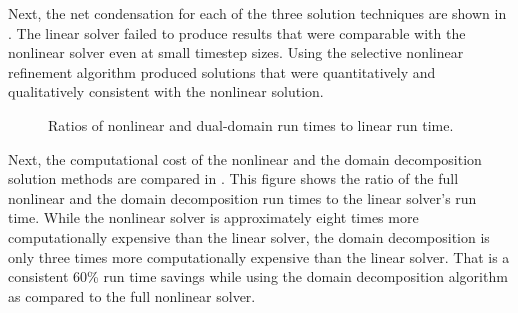 Next, the net condensation for each of the three solution techniques are shown in .
The linear solver failed to produce results that were comparable with the nonlinear solver even at small timestep sizes.
Using the selective nonlinear refinement algorithm produced solutions that were quantitatively and qualitatively consistent with the nonlinear solution.

\begin{figure}[h!tb]
\centering

\caption{Ratios of nonlinear and dual-domain run times to linear run time.}
\label{fig:refillRunTimeRatios}
\end{figure}

Next, the computational cost of the nonlinear and the domain decomposition solution methods are compared in .
This figure shows the ratio of the full nonlinear and the domain decomposition run times to the linear solver's run time.
While the nonlinear solver is approximately eight times more computationally expensive than the linear solver, the domain decomposition is only three times more computationally expensive than the linear solver.
That is a consistent 60\% run time savings while using the domain decomposition algorithm as compared to the full nonlinear solver.